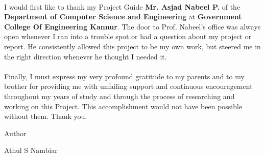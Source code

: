 \thispagestyle{empty}

\paragraph{} I would first like to thank my Project Guide \textbf{Mr. Asjad Nabeel P.} of the \textbf{Department of Computer Science and Engineering} at \textbf{Government College Of Engineering Kannur}. The door to Prof. Nabeel's office was always open whenever I ran into a trouble spot or had a question about my project or report. He consistently allowed this project to be my own work, but steered me in the right direction whenever he thought I needed it.

\paragraph{}Finally, I must express my very profound gratitude to my parents and to my brother for providing me with unfailing support and continuous encouragement throughout my years of study and through the process of researching and working on this Project. This accomplishment would not have been possible without them. Thank you.

Author

Athul S Nambiar